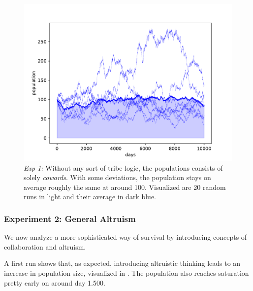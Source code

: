 \documentclass[sigconf]{acmart}
\newcommand{\VNumSimulations}{20\xspace}
\newcommand{\VNumPop}{100\xspace}
\newcommand{\cowards}{\textit{cowards}\xspace}
\begin{document}
    \begin{figure}
        \includegraphics[width=\columnwidth]{figures/exp1_stable_pop}
        \caption{\textit{Exp 1:} Without any sort of tribe logic, the populations consists of solely \cowards.
        With some deviations, the population stays on average roughly the same at around \VNumPop.
        Visualized are \VNumSimulations random runs in light and their average in dark blue. }
        \label{fig:exp1_stable_pop}
    \end{figure}


    \subsubsection*{Experiment 2: General Altruism}

    We now analyze a more sophisticated way of survival by introducing concepts of collaboration and altruism.

    A first run shows that, as expected, introducing altruistic thinking leads to an increase in population size, visualized in .
    The population also reaches saturation pretty early on around day 1.500.
\end{document}
